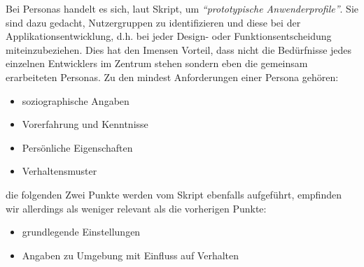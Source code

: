 Bei Personas handelt es sich, laut Skript, um \textit{``prototypische
Anwenderprofile''}. Sie sind dazu gedacht, Nutzergruppen zu identifizieren und
diese bei der Applikationsentwicklung, d.h. bei jeder Design- oder
Funktionsentscheidung miteinzubeziehen. Dies hat den Imensen Vorteil, dass nicht
die Bedürfnisse jedes einzelnen Entwicklers im Zentrum stehen sondern eben die
gemeinsam erarbeiteten Personas. Zu den mindest Anforderungen einer Persona
gehören: 
\begin{itemize}
  \item soziographische Angaben
  \item Vorerfahrung und Kenntnisse
  \item Persönliche Eigenschaften
  \item Verhaltensmuster
\end{itemize}

die folgenden Zwei Punkte werden vom Skript ebenfalls aufgeführt, empfinden wir
allerdings als weniger relevant als die vorherigen Punkte:
\begin{itemize}
  \item grundlegende Einstellungen 
  \item Angaben zu Umgebung mit Einfluss auf Verhalten
\end{itemize}
